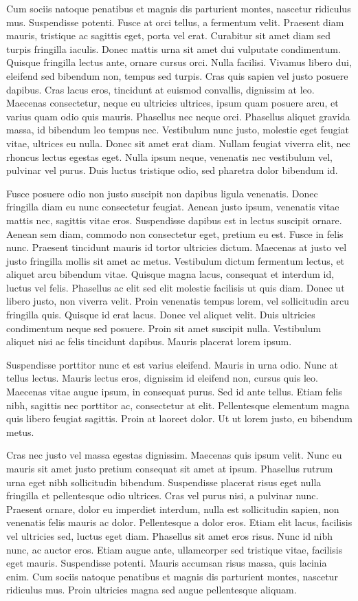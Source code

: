 Cum sociis natoque penatibus et magnis dis parturient montes, nascetur ridiculus mus.
Suspendisse potenti.
Fusce at orci tellus, a fermentum velit.
Praesent diam mauris, tristique ac sagittis eget, porta vel erat.
Curabitur sit amet diam sed turpis fringilla iaculis.
Donec mattis urna sit amet dui vulputate condimentum.
Quisque fringilla lectus ante, ornare cursus orci.
Nulla facilisi.
Vivamus libero dui, eleifend sed bibendum non, tempus sed turpis.
Cras quis sapien vel justo posuere dapibus.
Cras lacus eros, tincidunt at euismod convallis, dignissim at leo.
Maecenas consectetur, neque eu ultricies ultrices, ipsum quam posuere arcu, et varius quam odio quis mauris.
Phasellus nec neque orci.
Phasellus aliquet gravida massa, id bibendum leo tempus nec.
Vestibulum nunc justo, molestie eget feugiat vitae, ultrices eu nulla.
Donec sit amet erat diam.
Nullam feugiat viverra elit, nec rhoncus lectus egestas eget.
Nulla ipsum neque, venenatis nec vestibulum vel, pulvinar vel purus.
Duis luctus tristique odio, sed pharetra dolor bibendum id.

Fusce posuere odio non justo suscipit non dapibus ligula venenatis.
Donec fringilla diam eu nunc consectetur feugiat.
Aenean justo ipsum, venenatis vitae mattis nec, sagittis vitae eros.
Suspendisse dapibus est in lectus suscipit ornare.
Aenean sem diam, commodo non consectetur eget, pretium eu est.
Fusce in felis nunc.
Praesent tincidunt mauris id tortor ultricies dictum.
Maecenas at justo vel justo fringilla mollis sit amet ac metus.
Vestibulum dictum fermentum lectus, et aliquet arcu bibendum vitae.
Quisque magna lacus, consequat et interdum id, luctus vel felis.
Phasellus ac elit sed elit molestie facilisis ut quis diam.
Donec ut libero justo, non viverra velit.
Proin venenatis tempus lorem, vel sollicitudin arcu fringilla quis.
Quisque id erat lacus.
Donec vel aliquet velit.
Duis ultricies condimentum neque sed posuere.
Proin sit amet suscipit nulla.
Vestibulum aliquet nisi ac felis tincidunt dapibus.
Mauris placerat lorem ipsum.

Suspendisse porttitor nunc et est varius eleifend.
Mauris in urna odio.
Nunc at tellus lectus.
Mauris lectus eros, dignissim id eleifend non, cursus quis leo.
Maecenas vitae augue ipsum, in consequat purus.
Sed id ante tellus.
Etiam felis nibh, sagittis nec porttitor ac, consectetur at elit.
Pellentesque elementum magna quis libero feugiat sagittis.
Proin at laoreet dolor.
Ut ut lorem justo, eu bibendum metus.

Cras nec justo vel massa egestas dignissim.
Maecenas quis ipsum velit.
Nunc eu mauris sit amet justo pretium consequat sit amet at ipsum.
Phasellus rutrum urna eget nibh sollicitudin bibendum.
Suspendisse placerat risus eget nulla fringilla et pellentesque odio ultrices.
Cras vel purus nisi, a pulvinar nunc.
Praesent ornare, dolor eu imperdiet interdum, nulla est sollicitudin sapien, non venenatis felis mauris ac dolor.
Pellentesque a dolor eros.
Etiam elit lacus, facilisis vel ultricies sed, luctus eget diam.
Phasellus sit amet eros risus.
Nunc id nibh nunc, ac auctor eros.
Etiam augue ante, ullamcorper sed tristique vitae, facilisis eget mauris.
Suspendisse potenti.
Mauris accumsan risus massa, quis lacinia enim.
Cum sociis natoque penatibus et magnis dis parturient montes, nascetur ridiculus mus.
Proin ultricies magna sed augue pellentesque aliquam.